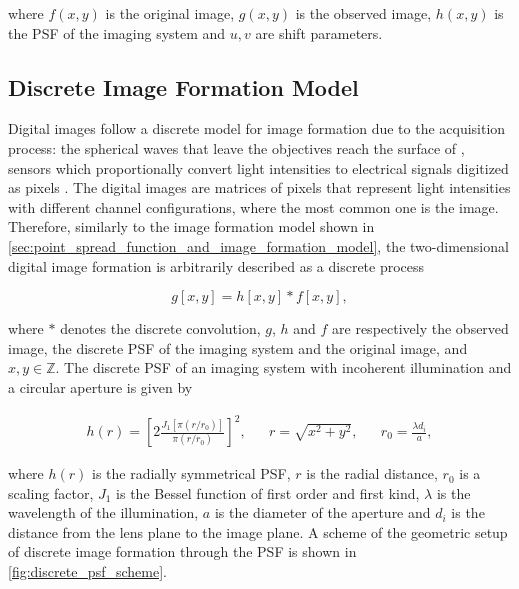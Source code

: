 \noindent where $f(x,y)$ is the original image, $g(x,y)$ is the observed image, $h(x,y)$ is the PSF of the imaging system and $u,v$ are shift parameters.

\subsection{Discrete Image Formation Model}

Digital images follow a discrete model for image formation due to the acquisition process: the spherical waves that leave the objectives reach the surface of , sensors which proportionally convert light intensities to electrical signals digitized as pixels \cite{gonzalez2018digital}. The digital images are matrices of pixels that represent light intensities with different channel configurations, where the most common one is the  image. Therefore, similarly to the image formation model shown in \autoref{sec:point_spread_function_and_image_formation_model}, the two-dimensional digital image formation is arbitrarily described as a discrete process

\begin{equation}
\label{eqn:discrete_image_formation}
g[x,y] = h[x,y] \ast f[x,y],
\end{equation}

\noindent where $\ast$ denotes the discrete convolution, $g$, $h$ and $f$ are respectively the observed image, the discrete PSF of the imaging system and the original image, and $x,y \in \mathbb{Z}$. The discrete PSF of an imaging system with incoherent illumination and a circular aperture is given by

\begin{align}
\label{eqn:discrete_psf}
h(r) = \left[
        2
        \frac{J_{1}[\pi (r / r_{0})]}{\pi (r / r_{0})}
       \right]^{2},
&&
r = \sqrt{x^{2} + y^{2}},
&&
r_{0} = \frac{\lambda d_{i}}{a},
\end{align}

\noindent where $h(r)$ is the radially symmetrical PSF, $r$ is the radial distance, $r_{0}$ is a scaling factor, $J_{1}$ is the Bessel function of first order and first kind, $\lambda$ is the wavelength of the illumination, $a$ is the diameter of the aperture and $d_{i}$ is the distance from the lens plane to the image plane. A scheme of the geometric setup of discrete image formation through the PSF is shown in \autoref{fig:discrete_psf_scheme}.

